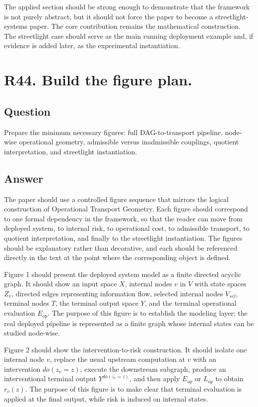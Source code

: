 \documentclass[11pt,a4paper]{article}
\begin{document}
The applied section should be strong enough to demonstrate that the framework is not purely abstract, but it should not force the paper to become a streetlight-systems paper. The core contribution remains the mathematical construction. The streetlight case should serve as the main running deployment example and, if evidence is added later, as the experimental instantiation.

\section*{R44. Build the figure plan.}

\subsection*{Question}

Prepare the minimum necessary figures: full DAG-to-transport pipeline, node-wise operational geometry, admissible versus inadmissible couplings, quotient interpretation, and streetlight instantiation.

\subsection*{Answer}

The paper should use a controlled figure sequence that mirrors the logical construction of Operational Transport Geometry. Each figure should correspond to one formal dependency in the framework, so that the reader can move from deployed system, to internal risk, to operational cost, to admissible transport, to quotient interpretation, and finally to the streetlight instantiation. The figures should be explanatory rather than decorative, and each should be referenced directly in the text at the point where the corresponding object is defined.

Figure 1 should present the deployed system model as a finite directed acyclic graph. It should show an input space \(X\), internal nodes \(v\) in \(V\) with state spaces \(Z_v\), directed edges representing information flow, selected internal nodes \(V_{sel}\), terminal nodes \(T\), the terminal output space \(Y\), and the terminal operational evaluation \(E_{op}\). The purpose of this figure is to establish the modeling layer: the real deployed pipeline is represented as a finite graph whose internal states can be studied node-wise.

Figure 2 should show the intervention-to-risk construction. It should isolate one internal node \(v\), replace the usual upstream computation at \(v\) with an intervention \(do(z_v = z)\), execute the downstream subgraph, produce an interventional terminal output \(Y^{do(z_v=z)}\), and then apply \(E_{op}\) or \(L_{op}\) to obtain \(r_v(z)\). The purpose of this figure is to make clear that terminal evaluation is applied at the final output, while risk is induced on internal states.
\end{document}
